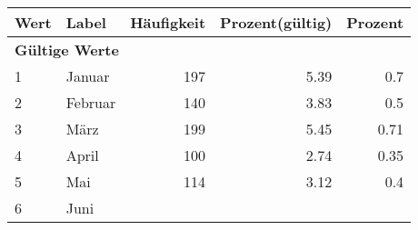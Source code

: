      \begin{longtable}{lXrrr}
     \toprule
     \textbf{Wert} & \textbf{Label} & \textbf{Häufigkeit} & \textbf{Prozent(gültig)} & \textbf{Prozent} \\
     \endhead
     \midrule
     \multicolumn{5}{l}{\textbf{Gültige Werte}}\\

     1 &
     \multicolumn{1}{X}{ Januar   } &


       \num{197} &
       \num[round-mode=places,round-precision=2]{5.39} &
         \num[round-mode=places,round-precision=2]{0.7} \\

     2 &
     \multicolumn{1}{X}{ Februar   } &


       \num{140} &
       \num[round-mode=places,round-precision=2]{3.83} &
         \num[round-mode=places,round-precision=2]{0.5} \\

     3 &
     \multicolumn{1}{X}{ März   } &


       \num{199} &
       \num[round-mode=places,round-precision=2]{5.45} &
         \num[round-mode=places,round-precision=2]{0.71} \\

     4 &
     \multicolumn{1}{X}{ April   } &


       \num{100} &
       \num[round-mode=places,round-precision=2]{2.74} &
         \num[round-mode=places,round-precision=2]{0.35} \\

     5 &
     \multicolumn{1}{X}{ Mai   } &


       \num{114} &
       \num[round-mode=places,round-precision=2]{3.12} &
         \num[round-mode=places,round-precision=2]{0.4} \\

     6 &
     \multicolumn{1}{X}{ Juni   } &



\end{longtable}

